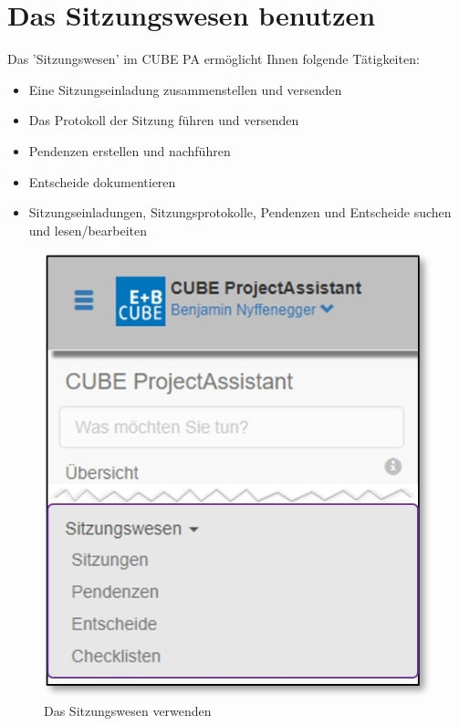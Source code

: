 \clearpage
\section{Das Sitzungswesen benutzen}

Das 'Sitzungswesen' im CUBE PA ermöglicht Ihnen folgende Tätigkeiten:


\begin{itemize}
\item
Eine Sitzungseinladung zusammenstellen und versenden
\item
Das Protokoll der Sitzung führen und versenden
\item
Pendenzen erstellen und nachführen
\item
Entscheide dokumentieren
\item
Sitzungseinladungen, Sitzungsprotokolle, Pendenzen und Entscheide suchen und lesen/bearbeiten
\end{itemize}

\vspace{.3cm}

\begin{figure}   %
  \vspace{-35pt}      %
  \begin{center}
    \includegraphics[width=1\linewidth]{../chapters/05_Sitzungswesen/pictures/5-1_Menu_Sitzungswesen.jpg}
  \end{center}
  \vspace{-20pt}
  \caption{Das Sitzungswesen verwenden}
  \vspace{-10pt}
\end{figure}

